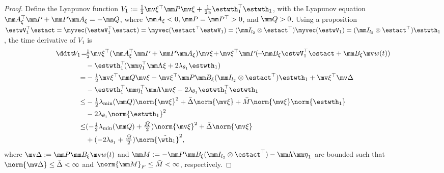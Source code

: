 \documentclass[letterpaper, 10 pt, conference]{ieeeconf}  %
\begin{document}
\begin{proof}
Define the Lyapunov function $V_1:=\tfrac{1}{2}\mv\xi^\top \mm P\mv\xi+\tfrac{1}{2\alpha}{\estwth}_1^\top {\estwth}_1$, with the Lyapunov equation $\mm A_\xi^\top \mm P+\mm P\mm A_\xi=-\mm Q$, where $\mm A_\xi<0,\mm P=\mm P^\top >0$, and $\mm Q>0$.
Using a proposition $\estwV_1^\top \estact = \myvec(\estwV_1^\top \estact)=\myvec(\estact^\top \estwV_1) = (\mm I_{l_2}\otimes {\estact}^\top )\myvec(\estwV_1)=(\mm I_{l_2}\otimes \estact^\top ){\estwth}_1$ \cite[Proposition~(7.1.9)]{Bernstein:2009aa}, the time derivative of $V_1$ is
\begin{equation}
    \begin{aligned}
        \ddtt \! {V}_1 
        \!=\!& 
        \tfrac{1}{2}
        \mv \xi^\top 
            (
                \mm A_\xi^\top \mm P+\mm P\mm A_\xi
            )
        \mv \xi
        \!+\!
        \mv \xi^\top \mm P (
            \!-\!\mm B_\xi\estwV_1^\top \estact +\mm B_\xi \mv w(t) 
        )\\
        &
        -{\estwth}_1^\top 
        \!
        (
            {\mm \eta}_1^\top \mm \Lambda \xi+2\lambda_{\theta_1} {\estwth}_1 
        )
        \\
        =& 
        -\tfrac{1}{2}
        \mv \xi^\top \mm Q\mv \xi 
        -
        \mv \xi^\top \mm P\mm B_\xi(\mm I_{l_2}\otimes \estact^\top ){\estwth}_1 
        +\mv \xi^\top \mv \Delta
        \\
        &
        -{\estwth}_1^\top {\mm \eta}_1^\top \mm \Lambda\mv \xi
        -2\lambda_{\theta_1} {\estwth}_1^\top {\estwth}_1
        \\
        \le&
        -
        \tfrac{1}{2}
        \lambda_\text{min}(\mm Q)\norm{\mv \xi} ^2
        +\bar\Delta \norm{\mv \xi}
        +\bar M\norm{\mv \xi} \norm{{\estwth}_1}
        \\
        &
        -2\lambda_{\theta_1}
        \norm{{\estwth}_1}^2
        \\
        \le& 
        (
            -\tfrac{1}{2}\lambda_\text{min}(\mm Q)
            +{\tfrac{\bar M}{2}}
        )
        \norm{\mv \xi}^2 +\bar\Delta \norm{\mv \xi}
        \\
        &+ 
        (
        -2\lambda_{\theta_1} 
        +\tfrac{\bar M}{2}
        )
        \norm{\tilde{\wth}_1}^2 
        ,
        \end{aligned}
        \label{eq. lya 1}
\end{equation}
where $\mv \Delta:= \mm P\mm B_\xi \mv w(t)$ and $\mm M:= -\mm P\mm B_\xi(\mm I_{l_2}\otimes \estact^\top )-\mm \Lambda{\mm \eta}_1$ are bounded such that $\norm{\mv \Delta}\le\bar\Delta<\infty$ and $\norm{\mm M}_F\le \bar M< \infty$, respectively.


\end{proof}
\end{document}
